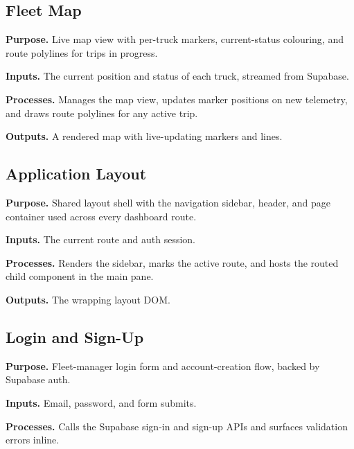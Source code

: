\subsection{Fleet Map}
\label{sec:code_frontend_fleetmap}

\noindent\textbf{Purpose.} Live map view with per-truck markers, current-status colouring, and route polylines for trips in progress.

\noindent\textbf{Inputs.} The current position and status of each truck, streamed from Supabase.

\noindent\textbf{Processes.} Manages the map view, updates marker positions on new telemetry, and draws route polylines for any active trip.

\noindent\textbf{Outputs.} A rendered map with live-updating markers and lines.



\subsection{Application Layout}
\label{sec:code_frontend_layout}

\noindent\textbf{Purpose.} Shared layout shell with the navigation sidebar, header, and page container used across every dashboard route.

\noindent\textbf{Inputs.} The current route and auth session.

\noindent\textbf{Processes.} Renders the sidebar, marks the active route, and hosts the routed child component in the main pane.

\noindent\textbf{Outputs.} The wrapping layout DOM.



\subsection{Login and Sign-Up}
\label{sec:code_frontend_login}

\noindent\textbf{Purpose.} Fleet-manager login form and account-creation flow, backed by Supabase auth.

\noindent\textbf{Inputs.} Email, password, and form submits.

\noindent\textbf{Processes.} Calls the Supabase sign-in and sign-up APIs and surfaces validation errors inline.

